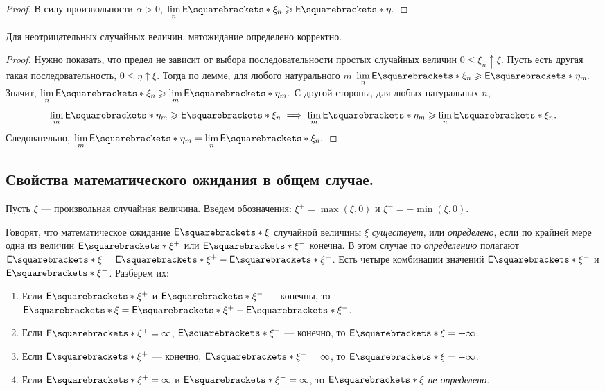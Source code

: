 \begin{enumerate}
\begin{proof}
            В силу произвольности \(\alpha > 0 \), \(\lim\limits_{n}\E{\xi_n} \geq \E{\eta}. \)
        \end{proof}    
    \begin{consequence}
        Для неотрицательных случайных величин, матожидание определено корректно.
    \end{consequence}
    \begin{proof}
        Нужно показать, что предел не зависит от выбора последовательности простых случайных величин \(0 \leq \xi_n \uparrow \xi. \) Пусть есть другая такая последовательность, \(0 \leq \eta \uparrow \xi. \) Тогда по лемме, для любого натурального $ m $ \(\lim\limits_{n}\E{\xi_n} \geq \E{\eta_m}. \) Значит, \(\lim\limits_{n}\E{\xi_n} \geq \lim\limits_{m}\E{\eta_m}. \)
        С другой стороны, для любых натуральных $ n $, \[\lim\limits_{m}\E{\eta_m} \geq \E{\xi_n} \implies \lim\limits_{m}\E{\eta_m} \geq \lim\limits_{n}\E{\xi_n}. \]
        Следовательно, \(\lim\limits_{m}\E{\eta_m} = \lim\limits_{n}\E{\xi_n}. \)
    \end{proof}
\end{enumerate}

\subsection {Свойства математического ожидания в общем случае.}
    Пусть $ \xi $ --- произвольная случайная величина. Введем обозначения: \(\xi^+ = \max(\xi, 0) \) и \(\xi^- = -\min(\xi, 0). \)

\begin{definition}
    Говорят, что математическое ожидание \(\E{\xi} \) случайной величины $ \xi $ \emph{существует}, или \emph{определено}, если по крайней мере одна из величин $ \E{\xi^+} $ или $ \E{\xi^-} $ конечна. В этом случае по \emph{определению} полагают \( \E{\xi} = \E{\xi^+} - \E{\xi^-} \).    
    Есть четыре комбинации значений $ \E{\xi^+} $ и $ \E{\xi^-} $. Разберем их:
    \begin{enumerate}
        \item Если $ \E{\xi^+} $ и $ \E{\xi^-} $ --- конечны, то \( \E{\xi} = \E{\xi^+} - \E{\xi^-} \).
        \item Если  $ \E{\xi^+} = \infty $, $ \E{\xi^-} $ --- конечно, то $ \E{\xi} = +\infty $.
        \item Если  $ \E{\xi^+} $ --- конечно, $ \E{\xi^-} = \infty $, то $ \E{\xi} = -\infty $.
        \item Если  $ \E{\xi^+} = \infty $ и $ \E{\xi^-} = \infty $, то $ \E{\xi} $ \emph{не определено}.
    \end{enumerate}
\end{definition}

